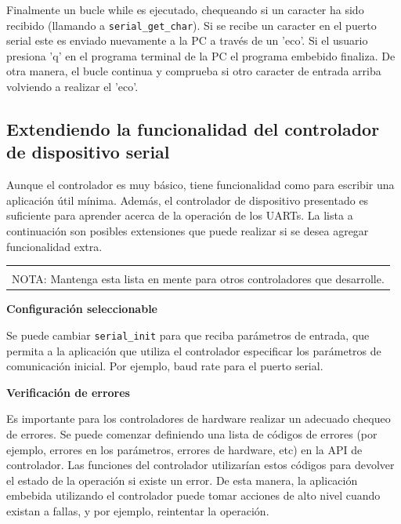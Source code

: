 \documentclass[output=paper, 
colorlinks,
citecolor=brown,
newtxmath
]{langscibook}
\begin{document}
Finalmente un bucle while es ejecutado, chequeando si un caracter
ha sido recibido (llamando a \texttt{serial\_get\_char}). Si se recibe un caracter
en el puerto serial este es enviado nuevamente a la PC a través de un 'eco'.
Si el usuario presiona 'q' en el programa terminal de la PC el programa
embebido finaliza. De otra manera, el bucle continua y comprueba si otro
caracter de entrada arriba volviendo a realizar el 'eco'.


\subsection {Extendiendo la funcionalidad del controlador de dispositivo serial}


Aunque el controlador es muy básico, tiene funcionalidad como para
escribir una aplicación útil mínima.
Además, el controlador de dispositivo 
presentado es suficiente para aprender acerca de la operación de los UARTs.
La lista a continuación son posibles extensiones que puede realizar
si se desea agregar funcionalidad extra.

\begin{center}
\begin{tabularx}{\textwidth}{|X|}
\hline
\rowcolor{aliceblue}
\textbf{}\\
NOTA: Mantenga esta lista en mente para otros controladores que desarrolle.\\
\hline
\end{tabularx}
\end{center}



\textbf{Configuración seleccionable}

Se puede cambiar \texttt{serial\_init} para que reciba parámetros de entrada,
que permita a la aplicación que utiliza el controlador especificar
los parámetros de comunicación inicial. Por ejemplo, baud rate para
el puerto serial.

\textbf{Verificación de errores}

Es importante para los controladores de hardware realizar un adecuado
chequeo de errores. Se puede comenzar definiendo una lista de códigos
de errores (por ejemplo, errores en los parámetros, errores de hardware, etc)
en la API de controlador.
Las funciones del controlador utilizarían estos códigos para devolver
el estado de la operación si existe un error. De esta manera, la aplicación embebida
utilizando el controlador puede tomar acciones de alto nivel cuando existan
a fallas, y por ejemplo, reintentar la operación.
\end{document}
